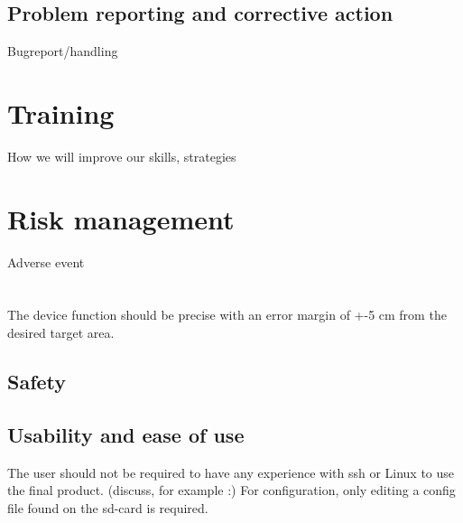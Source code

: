 \documentclass{article}
\begin{document}
\subsection{Problem reporting and corrective action}
Bugreport/handling
\section{Training}
How we will improve our skills, strategies
\section{Risk management}
Adverse event
\section{}

The device function should be precise with an error margin of +-5 cm from the desired target area. 

\subsection{Safety}

\subsection{Usability and ease of use}
The user should not be required to have any experience with ssh or Linux to use the final product. (discuss, for example :) For configuration, only editing a config file found on the sd-card is required.
\end{document}
